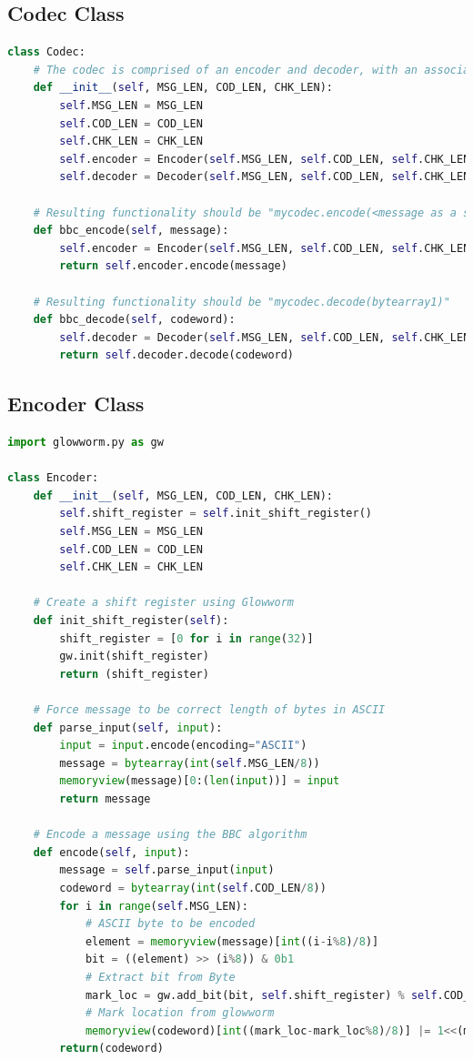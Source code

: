\documentclass[conference]{IEEEtran}
\begin{document}
\subsection{Codec Class}
\label{PyCodec}
\lstset{style=2ndstyle}
\begin{lstlisting}[language=Python]
class Codec:
    # The codec is comprised of an encoder and decoder, with an associated message/codeword pair
    def __init__(self, MSG_LEN, COD_LEN, CHK_LEN):
        self.MSG_LEN = MSG_LEN
        self.COD_LEN = COD_LEN
        self.CHK_LEN = CHK_LEN
        self.encoder = Encoder(self.MSG_LEN, self.COD_LEN, self.CHK_LEN)
        self.decoder = Decoder(self.MSG_LEN, self.COD_LEN, self.CHK_LEN)

    # Resulting functionality should be "mycodec.encode(<message as a string>)"
    def bbc_encode(self, message):
        self.encoder = Encoder(self.MSG_LEN, self.COD_LEN, self.CHK_LEN)
        return self.encoder.encode(message)

    # Resulting functionality should be "mycodec.decode(bytearray1)"
    def bbc_decode(self, codeword):
        self.decoder = Decoder(self.MSG_LEN, self.COD_LEN, self.CHK_LEN)
        return self.decoder.decode(codeword)
\end{lstlisting}  


\subsection{Encoder Class}
\label{PyEncoder}
\begin{lstlisting}[language=Python]
import glowworm.py as gw

class Encoder:
    def __init__(self, MSG_LEN, COD_LEN, CHK_LEN):
        self.shift_register = self.init_shift_register()
        self.MSG_LEN = MSG_LEN
        self.COD_LEN = COD_LEN
        self.CHK_LEN = CHK_LEN

    # Create a shift register using Glowworm
    def init_shift_register(self):
        shift_register = [0 for i in range(32)]
        gw.init(shift_register)
        return (shift_register)

    # Force message to be correct length of bytes in ASCII
    def parse_input(self, input):
        input = input.encode(encoding="ASCII")
        message = bytearray(int(self.MSG_LEN/8))
        memoryview(message)[0:(len(input))] = input
        return message

    # Encode a message using the BBC algorithm
    def encode(self, input):
        message = self.parse_input(input)
        codeword = bytearray(int(self.COD_LEN/8))
        for i in range(self.MSG_LEN):
            # ASCII byte to be encoded
            element = memoryview(message)[int((i-i%8)/8)]
            bit = ((element) >> (i%8)) & 0b1
            # Extract bit from Byte
            mark_loc = gw.add_bit(bit, self.shift_register) % self.COD_LEN
            # Mark location from glowworm
            memoryview(codeword)[int((mark_loc-mark_loc%8)/8)] |= 1<<(mark_loc%8)
        return(codeword)
\end{lstlisting} 
    
\end{document}
